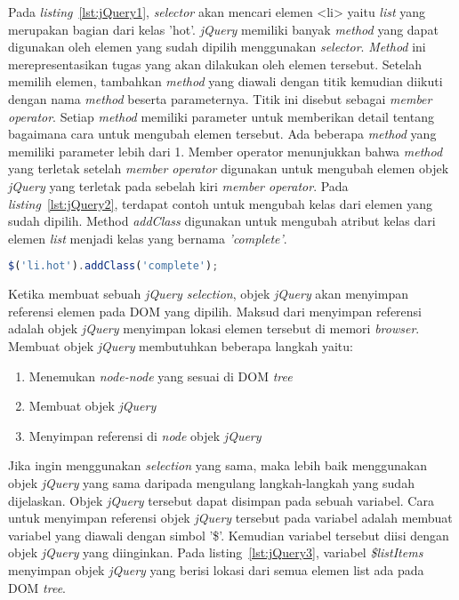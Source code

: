 Pada \textit{listing}~\ref{lst:jQuery1}, \textit{selector} akan mencari elemen <li> yaitu \textit{list} yang merupakan bagian dari kelas 'hot'. \textit{jQuery} memiliki banyak \textit{method} yang dapat digunakan oleh elemen yang sudah dipilih menggunakan \textit{selector}. \textit{Method} ini merepresentasikan tugas yang akan dilakukan oleh elemen tersebut. Setelah memilih elemen, tambahkan \textit{method} yang diawali dengan titik kemudian diikuti dengan nama \textit{method} beserta parameternya. Titik ini disebut sebagai \textit{member operator}. Setiap \textit{method} memiliki parameter untuk memberikan detail tentang bagaimana cara untuk mengubah elemen tersebut. Ada beberapa \textit{method} yang memiliki parameter lebih dari 1.  Member operator menunjukkan bahwa \textit{method} yang terletak setelah \textit{member operator} digunakan untuk mengubah elemen objek \textit{jQuery} yang terletak pada sebelah kiri \textit{member operator}. Pada \textit{listing}~\ref{lst:jQuery2}, terdapat contoh untuk mengubah kelas dari elemen yang sudah dipilih. Method \textit{addClass} digunakan untuk mengubah atribut kelas dari elemen \textit{list} menjadi kelas yang bernama \textit{'complete'}. 

\begin{lstlisting}[language=Javascript, caption=Mengubah kelas dari elemen yang sudah dipilih, label={lst:jQuery2}]
	$('li.hot').addClass('complete');
\end{lstlisting}

Ketika membuat sebuah \textit{jQuery selection}, objek \textit{jQuery} akan menyimpan referensi elemen pada DOM yang dipilih. Maksud dari menyimpan referensi adalah objek \textit{jQuery} menyimpan lokasi elemen tersebut di memori \textit{browser}. Membuat objek \textit{jQuery} membutuhkan beberapa langkah yaitu: 

\begin{enumerate}
	\item Menemukan \textit{node-node} yang sesuai di DOM \textit{tree}
	\item Membuat objek \textit{jQuery}
	\item Menyimpan referensi di \textit{node} objek \textit{jQuery}
\end{enumerate}

Jika ingin menggunakan \textit{selection} yang sama, maka lebih baik menggunakan objek \textit{jQuery} yang sama daripada mengulang langkah-langkah yang sudah dijelaskan. Objek \textit{jQuery} tersebut dapat disimpan pada sebuah variabel. Cara untuk menyimpan referensi objek \textit{jQuery} tersebut pada variabel adalah membuat variabel yang diawali dengan simbol '\$'. Kemudian variabel tersebut diisi dengan objek \textit{jQuery} yang diinginkan. Pada listing~\ref{lst:jQuery3}, variabel \textit{\$listItems} menyimpan objek \textit{jQuery} yang berisi lokasi dari semua elemen list ada pada DOM \textit{tree}.

